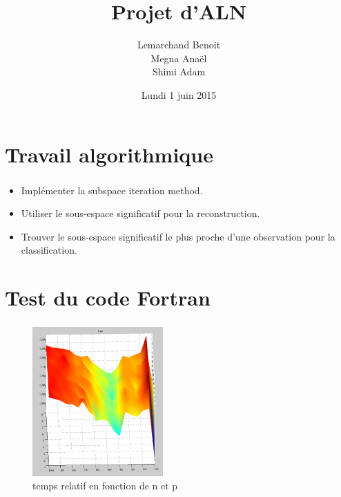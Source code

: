 \documentclass[slidetop,11pt]{beamer}
\title{Projet d'ALN}
\author{Lemarchand Benoit \\ Megna Anaël \\ Shimi Adam}
\institute{ENSEEIHT}
\date{Lundi 1 juin 2015}
\begin{document}
\frame{\titlepage}


\section{Travail algorithmique}
\begin{frame}
  \frametitle{}
  \begin{itemize}
    \item Implémenter la subspace iteration method.
    \item Utiliser le sous-espace significatif pour la reconstruction.
    \item Trouver le sous-espace significatif le plus proche d'une observation
          pour la classification.
  \end{itemize}
\end{frame}


\section{Test du code Fortran}
\begin{frame}
  \frametitle{}
  \begin{figure}
  \begin{center}
    \caption{temps relatif en fonction de n et p}
    \includegraphics[width=5cm]{imat4.png}
  \end{center}
  \end{figure}
\end{frame}


\end{document}
